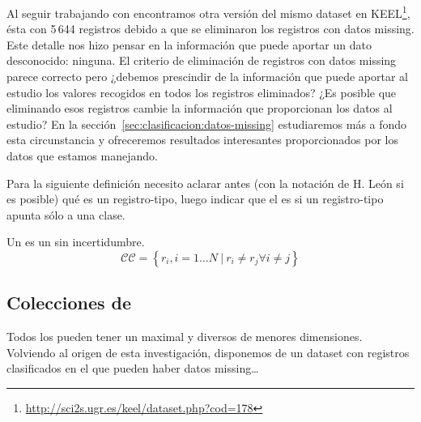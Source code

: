 Al seguir trabajando con \mushroom encontramos otra versión del mismo dataset en KEEL\footnote{\url{http://sci2s.ugr.es/keel/dataset.php?cod=178}}, ésta con 5\,644 registros debido a que se eliminaron los registros con datos missing. Este detalle nos hizo pensar en la información que puede aportar un dato desconocido: ninguna. El criterio de eliminación de registros con datos missing parece correcto pero ¿debemos prescindir de la información que puede aportar al estudio los valores recogidos en todos los registros eliminados? ¿Es posible que eliminando esos registros cambie la información que proporcionan los datos al estudio? En la sección~\ref{sec:clasificacion:datos-missing} estudiaremos más a fondo esta circunstancia y ofreceremos resultados interesantes proporcionados por los datos que estamos manejando.



Para la siguiente definición necesito aclarar antes (con la notación de H. León si es posible) qué es un registro-tipo, luego indicar que el \catalogo es \CC si un registro-tipo apunta sólo a una clase.

\begin{Definition}[\CC] Un \CC es un \catalogo sin incertidumbre.
   $$\mathcal{CC} = \left\{r_i, i = 1\ldots N\ | \ r_i \neq r_j \forall i \neq j\right\}$$
\label{def:catalogo-completo}
\end{Definition}








\subsection{Colecciones de \CCs}
\label{sec:clasificacion:catalogo-completo:colecciones}
%

Todos los \CCs pueden tener un \CC maximal y diversos \CCs de menores dimensiones. Volviendo al origen de esta investigación, disponemos de un dataset con registros clasificados en el que pueden haber datos missing\ldots 
